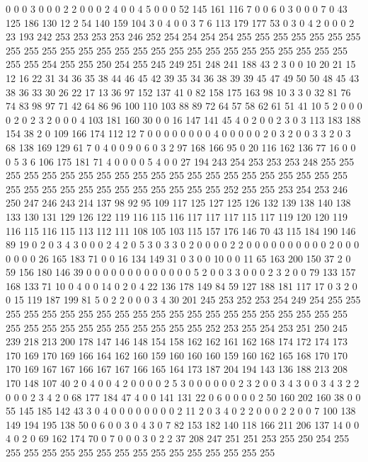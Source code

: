 0 0 0 3 0 0 0 2 2 0 0 0 2 4 0 0 4 5 0 0
0 52 145 161 116 7 0 0 6 0 3 0 0 0 7 0 43 125 186 130
12 2 54 140 159 104 3 0 4 0 0 3 7 6 113 179 177 53 0 3
0 4 2 0 0 0 2 23 193 242 253 253 253 253 246 252 254 254 254 254
255 255 255 255 255 255 255 255 255 255 255 255 255 255 255 255 255 255 255 255
255 255 255 255 255 255 255 255 254 255 255 250 254 255 245 249 251 248 241 188
43 2 3 0 0 10 20 21 15 12 16 22 31 34 36 35 38 44 46 45
42 39 35 34 36 38 39 39 45 47 49 50 50 48 45 43 38 36 33 30
26 22 17 13 36 97 152 137 41 0 82 158 175 163 98 10 3 3 0 32
81 76 74 83 98 97 71 42 64 86 96 100 110 103 88 89 72 64 57 58
62 61 51 41 10 5 2 0 0 0 0 2 0 2 3 2 0 0 0 4
103 181 160 30 0 0 16 147 141 45 4 0 2 0 0 2 3 0 3 113
183 188 154 38 2 0 109 166 174 112 12 7 0 0 0 0 0 0 0 0
4 0 0 0 0 0 2 0 3 2 0 0 3 3 2 0 3 68 138 169
129 61 7 0 4 0 0 9 0 6 0 3 2 97 168 166 95 0 20 116
162 136 77 16 0 0 0 5 3 6 106 175 181 71 4 0 0 0 0 5
4 0 0 27 194 243 254 253 253 253 248 255 255 255 255 255 255 255 255 255
255 255 255 255 255 255 255 255 255 255 255 255 255 255 255 255 255 255 255 255
255 255 255 255 252 255 255 253 254 253 246 250 247 246 243 214 137 98 92 95
109 117 125 127 125 126 132 139 138 140 138 133 130 131 129 126 122 119 116 115
116 117 117 117 115 117 119 120 120 119 116 115 116 115 113 112 111 108 105 103
115 157 176 146 70 43 115 184 190 146 89 19 0 2 0 3 4 3 0 0
0 2 4 2 0 5 3 0 3 3 0 2 0 0 0 0 2 2 0 0
0 0 0 0 0 0 0 0 2 0 0 0 0 0 0 0 26 165 183 71
0 0 16 134 149 31 0 3 0 0 10 0 0 11 65 163 200 150 37 2
0 59 156 180 146 39 0 0 0 0 0 0 0 0 0 0 0 0 0 5
2 0 0 3 3 0 0 0 2 3 2 0 0 79 133 157 168 133 71 10
0 4 0 0 14 0 2 0 4 22 136 178 149 84 59 127 188 181 117 17
0 3 2 0 0 15 119 187 199 81 5 0 2 2 0 0 0 3 4 30
201 245 253 252 253 254 249 254 255 255 255 255 255 255 255 255 255 255 255 255
255 255 255 255 255 255 255 255 255 255 255 255 255 255 255 255 255 255 255 255
252 253 255 254 253 251 250 245 239 218 213 200 178 147 146 148 154 158 162 162
161 162 168 174 172 174 173 170 169 170 169 166 164 162 160 159 160 160 160 159
160 162 165 168 170 170 170 169 167 167 166 167 167 166 165 164 173 187 204 194
143 136 188 213 208 170 148 107 40 2 0 4 0 0 4 2 0 0 0 0
2 5 3 0 0 0 0 0 0 2 3 2 0 0 3 4 3 0 0 3
4 3 2 2 0 0 0 2 3 4 2 0 68 177 184 47 4 0 0 141
131 22 0 6 0 0 0 0 2 50 160 202 160 38 0 0 55 145 185 142
43 3 0 4 0 0 0 0 0 0 0 0 2 11 2 0 3 4 0 2
2 0 0 0 2 2 0 0 7 100 138 149 194 195 138 50 0 6 0 0
3 0 4 3 0 7 82 153 182 140 118 166 211 206 137 14 0 0 4 0
2 0 69 162 174 70 0 7 0 0 0 3 0 2 2 37 208 247 251 251
253 255 250 254 255 255 255 255 255 255 255 255 255 255 255 255 255 255 255 255
